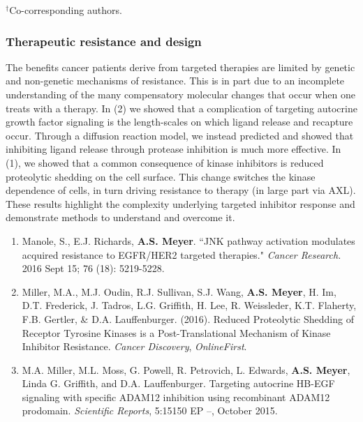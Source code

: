 \documentclass[11pt]{article}
\begin{document}
\noindent $^\dag$Co-corresponding authors.






\subsubsection{Therapeutic resistance and design} %

The benefits cancer patients derive from targeted therapies are limited by genetic and non-genetic mechanisms of resistance. This is in part due to an incomplete understanding of the many compensatory molecular changes that occur when one treats with a therapy. In (2) we showed that a complication of targeting autocrine growth factor signaling is the length-scales on which ligand release and recapture occur. Through a diffusion reaction model, we instead predicted and showed that inhibiting ligand release through protease inhibition is much more effective. In (1), we showed that a common consequence of kinase inhibitors is reduced proteolytic shedding on the cell surface. This change switches the kinase dependence of cells, in turn driving resistance to therapy (in large part via AXL). These results highlight the complexity underlying targeted inhibitor response and demonstrate methods to understand and overcome it.

\begin{enumerate}
  \item Manole, S., E.J. Richards, {\bf A.S. Meyer}. ``JNK pathway activation modulates acquired resistance to EGFR/HER2 targeted therapies." {\sl Cancer Research.} 2016 Sept 15; 76 (18): 5219-5228.
  \item Miller, M.A., M.J. Oudin, R.J. Sullivan, S.J. Wang, \textbf{A.S. Meyer}, H. Im, D.T. Frederick, J. Tadros, L.G. Griffith, H. Lee, R. Weissleder, K.T. Flaherty, F.B. Gertler, \& D.A. Lauffenburger. (2016). Reduced Proteolytic Shedding of Receptor Tyrosine Kinases is a Post-Translational Mechanism of Kinase Inhibitor Resistance. \emph{Cancer Discovery}, \emph{OnlineFirst}.
  \item M.A. Miller, M.L. Moss, G. Powell, R. Petrovich, L. Edwards, \textbf{A.S. Meyer}, Linda G. Griffith, and D.A. Lauffenburger. Targeting autocrine HB-EGF signaling with specific ADAM12 inhibition using recombinant ADAM12 prodomain. \emph{Scientific Reports}, 5:15150 EP --, October 2015.
\end{enumerate}
\end{document}

